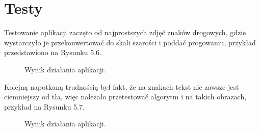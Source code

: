 \documentclass[eng,oneside]{mgr}
\begin{document}
\section{Testy}
Testowanie aplikacji zaczęto od najprostszych zdjęć znaków drogowych, gdzie wystarczyło je przekonwertować do skali szarości i poddać progowaniu, przykład przedstawiono na Rysunku 5.6.
\begin{figure}[htbp]
\centering
{}
\quad
{}
\caption{Wynik działania aplikacji.}
\end{figure}
\par Kolejną napotkaną trudnością był fakt, że na znakach tekst nie zawsze jest ciemniejszy od tła, więc należało przetestować algorytm i na takich obrazach, przykład na Rysunku 5.7.
\begin{figure}[htbp]
\centering
{}
\quad
{}
\caption{Wynik działania aplikacji.}
\end{figure}
\end{document}
